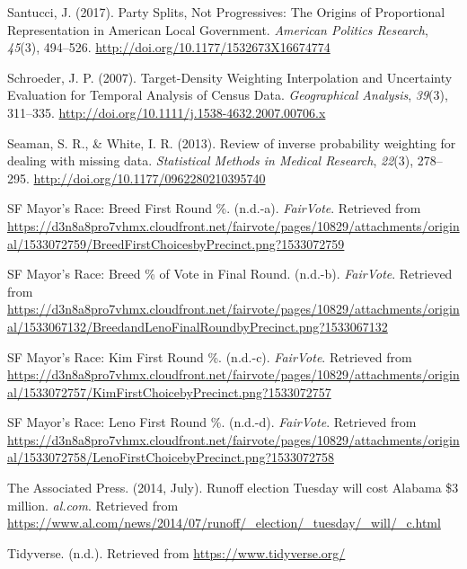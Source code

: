 \documentclass[12pt,twoside]{reedthesis}
\begin{document}
\leavevmode\hypertarget{ref-santucci_party_2017}{}%
Santucci, J. (2017). Party Splits, Not Progressives: The Origins of Proportional Representation in American Local Government. \emph{American Politics Research}, \emph{45}(3), 494--526. \url{http://doi.org/10.1177/1532673X16674774}

\leavevmode\hypertarget{ref-schroeder_target-density_2007}{}%
Schroeder, J. P. (2007). Target-Density Weighting Interpolation and Uncertainty Evaluation for Temporal Analysis of Census Data. \emph{Geographical Analysis}, \emph{39}(3), 311--335. \url{http://doi.org/10.1111/j.1538-4632.2007.00706.x}

\leavevmode\hypertarget{ref-seaman_review_2013}{}%
Seaman, S. R., \& White, I. R. (2013). Review of inverse probability weighting for dealing with missing data. \emph{Statistical Methods in Medical Research}, \emph{22}(3), 278--295. \url{http://doi.org/10.1177/0962280210395740}

\leavevmode\hypertarget{ref-noauthor_sf_nodate-1}{}%
SF Mayor's Race: Breed First Round \%. (n.d.-a). \emph{FairVote}. Retrieved from \url{https://d3n8a8pro7vhmx.cloudfront.net/fairvote/pages/10829/attachments/original/1533072759/BreedFirstChoicesbyPrecinct.png?1533072759}

\leavevmode\hypertarget{ref-noauthor_sf_nodate}{}%
SF Mayor's Race: Breed \% of Vote in Final Round. (n.d.-b). \emph{FairVote}. Retrieved from \url{https://d3n8a8pro7vhmx.cloudfront.net/fairvote/pages/10829/attachments/original/1533067132/BreedandLenoFinalRoundbyPrecinct.png?1533067132}

\leavevmode\hypertarget{ref-noauthor_sf_nodate-3}{}%
SF Mayor's Race: Kim First Round \%. (n.d.-c). \emph{FairVote}. Retrieved from \url{https://d3n8a8pro7vhmx.cloudfront.net/fairvote/pages/10829/attachments/original/1533072757/KimFirstChoicebyPrecinct.png?1533072757}

\leavevmode\hypertarget{ref-noauthor_sf_nodate-2}{}%
SF Mayor's Race: Leno First Round \%. (n.d.-d). \emph{FairVote}. Retrieved from \url{https://d3n8a8pro7vhmx.cloudfront.net/fairvote/pages/10829/attachments/original/1533072758/LenoFirstChoicebyPrecinct.png?1533072758}

\leavevmode\hypertarget{ref-the_associated_press_runoff_2014}{}%
The Associated Press. (2014, July). Runoff election Tuesday will cost Alabama \$3 million. \emph{al.com}. Retrieved from \url{https://www.al.com/news/2014/07/runoff/_election/_tuesday/_will/_c.html}

\leavevmode\hypertarget{ref-noauthor_tidyverse_nodate}{}%
Tidyverse. (n.d.). Retrieved from \url{https://www.tidyverse.org/}
\end{document}
